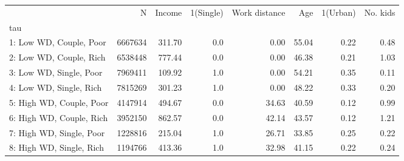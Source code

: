 \begin{tabular}{lrrrrrrr}
\toprule
{} &        N &  Income &  1(Single) &  Work distance &    Age &  1(Urban) &  No. kids \\
tau                      &          &         &            &                &        &           &           \\
\midrule
1: Low WD, Couple, Poor  &  6667634 &  311.70 &        0.0 &           0.00 &  55.04 &      0.22 &      0.48 \\
2: Low WD, Couple, Rich  &  6538448 &  777.44 &        0.0 &           0.00 &  46.38 &      0.21 &      1.03 \\
3: Low WD, Single, Poor  &  7969411 &  109.92 &        1.0 &           0.00 &  54.21 &      0.35 &      0.11 \\
4: Low WD, Single, Rich  &  7815269 &  301.23 &        1.0 &           0.00 &  48.22 &      0.33 &      0.20 \\
5: High WD, Couple, Poor &  4147914 &  494.67 &        0.0 &          34.63 &  40.59 &      0.12 &      0.99 \\
6: High WD, Couple, Rich &  3952150 &  862.57 &        0.0 &          42.14 &  43.57 &      0.12 &      1.21 \\
7: High WD, Single, Poor &  1228816 &  215.04 &        1.0 &          26.71 &  33.85 &      0.25 &      0.22 \\
8: High WD, Single, Rich &  1194766 &  413.36 &        1.0 &          32.98 &  41.15 &      0.22 &      0.24 \\
\bottomrule
\end{tabular}
